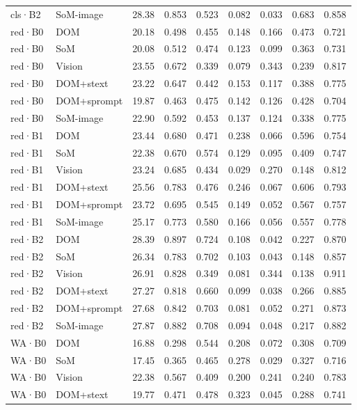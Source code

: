 \begin{table}[tp]
\begin{tabular}{@{}lllllllll@{}}
cls·B2 & SoM-image & 28.38 & 0.853 & 0.523 & 0.082 & 0.033 & 0.683 & 0.858 \\
red·B0 & DOM & 20.18 & 0.498 & 0.455 & 0.148 & 0.166 & 0.473 & 0.721 \\
red·B0 & SoM & 20.08 & 0.512 & 0.474 & 0.123 & 0.099 & 0.363 & 0.731 \\
red·B0 & Vision & 23.55 & 0.672 & 0.339 & 0.079 & 0.343 & 0.239 & 0.817 \\
red·B0 & DOM+stext & 23.22 & 0.647 & 0.442 & 0.153 & 0.117 & 0.388 & 0.775 \\
red·B0 & DOM+sprompt & 19.87 & 0.463 & 0.475 & 0.142 & 0.126 & 0.428 & 0.704 \\
red·B0 & SoM-image & 22.90 & 0.592 & 0.453 & 0.137 & 0.124 & 0.338 & 0.775 \\
red·B1 & DOM & 23.44 & 0.680 & 0.471 & 0.238 & 0.066 & 0.596 & 0.754 \\
red·B1 & SoM & 22.38 & 0.670 & 0.574 & 0.129 & 0.095 & 0.409 & 0.747 \\
red·B1 & Vision & 23.24 & 0.685 & 0.434 & 0.029 & 0.270 & 0.148 & 0.812 \\
red·B1 & DOM+stext & 25.56 & 0.783 & 0.476 & 0.246 & 0.067 & 0.606 & 0.793 \\
red·B1 & DOM+sprompt & 23.72 & 0.695 & 0.545 & 0.149 & 0.052 & 0.567 & 0.757 \\
red·B1 & SoM-image & 25.17 & 0.773 & 0.580 & 0.166 & 0.056 & 0.557 & 0.778 \\
red·B2 & DOM & 28.39 & 0.897 & 0.724 & 0.108 & 0.042 & 0.227 & 0.870 \\
red·B2 & SoM & 26.34 & 0.783 & 0.702 & 0.103 & 0.043 & 0.148 & 0.857 \\
red·B2 & Vision & 26.91 & 0.828 & 0.349 & 0.081 & 0.344 & 0.138 & 0.911 \\
red·B2 & DOM+stext & 27.27 & 0.818 & 0.660 & 0.099 & 0.038 & 0.266 & 0.885 \\
red·B2 & DOM+sprompt & 27.68 & 0.842 & 0.703 & 0.081 & 0.052 & 0.271 & 0.873 \\
red·B2 & SoM-image & 27.87 & 0.882 & 0.708 & 0.094 & 0.048 & 0.217 & 0.882 \\
WA·B0 & DOM & 16.88 & 0.298 & 0.544 & 0.208 & 0.072 & 0.308 & 0.709 \\
WA·B0 & SoM & 17.45 & 0.365 & 0.465 & 0.278 & 0.029 & 0.327 & 0.716 \\
WA·B0 & Vision & 22.38 & 0.567 & 0.409 & 0.200 & 0.241 & 0.240 & 0.783 \\
WA·B0 & DOM+stext & 19.77 & 0.471 & 0.478 & 0.323 & 0.045 & 0.288 & 0.741 \\

\end{tabular}
\end{table}
